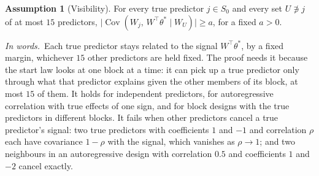 \documentclass[11pt]{article}
\newcommand{\abs}[1]{\lvert #1\rvert}
\newcommand{\Cov}{\operatorname{Cov}}
\newcommand{\tstar}{\theta^*}
\newcommand{\Sz}{S_0}
\theoremstyle{plain}
\theoremstyle{definition}
\newtheorem{asm}{Assumption}
\newcommand{\words}{\par\smallskip\noindent\textit{In words.}\ }
\begin{document}
\begin{asm}[Visibility]\label{a:vis}
For every true predictor $j\in\Sz$ and every set $U\not\ni j$ of at most $15$ predictors,
$\abs{\Cov(W_j,\,W^\top\tstar\mid W_U)}\ge a$, for a fixed $a>0$.
\end{asm}
\words Each true predictor stays related to the signal $W^\top\tstar$, by a fixed margin, whichever $15$ other
predictors are held fixed. The proof needs it because the start law looks at one block at a time: it can pick up a true
predictor only through what that predictor explains given the other members of its block, at most $15$ of them. It
holds for independent predictors, for autoregressive correlation with true effects of one sign, and for block designs
with the true predictors in different blocks. It fails when other predictors cancel a true predictor's signal: two
true predictors with coefficients $1$ and $-1$ and correlation $\rho$ each have covariance $1-\rho$ with the signal,
which vanishes as $\rho\to1$; and two neighbours in an autoregressive design with correlation $0.5$ and coefficients
$1$ and $-2$ cancel exactly.
\end{document}

